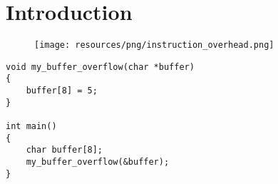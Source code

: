 \chapter*{Introduction}





\begin{figure}[h]
    \centering
    \texttt{[image: resources/png/instruction\_overhead.png]}
    \label{fig:inst}
\end{figure}


\begin{lstlisting}
void my_buffer_overflow(char *buffer)
{
    buffer[8] = 5;   
}

int main()
{
    char buffer[8];
    my_buffer_overflow(&buffer);
}
\end{lstlisting}



